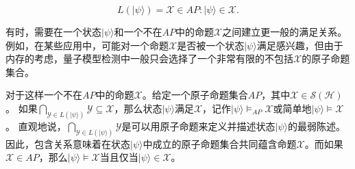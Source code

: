 \begin{equation}
L(|\psi\rangle) = {\mathcal{X} \in AP : |\psi\rangle \in \mathcal{X}}.
\end{equation}

有时，需要在一个状态$|\psi\rangle$和一个不在$AP$中的命题$\mathcal{X}$之间建立更一般的满足关系。例如，在某些应用中，可能对一个命题$\mathcal{X}$是否被一个状态$|\psi\rangle$满足感兴趣，但由于内存的考虑，量子模型检测中一般只会选择了一个非常有限的不包括$\mathcal{X}$的原子命题集合。

对于这样一个不在$AP$中的命题$\mathcal{X}$。给定一个原子命题集合$AP$，其中$\mathcal{X} \in \mathcal{S}(\mathcal{H})$。
如果$\bigcap_{\mathcal{Y} \in L(|\psi\rangle) }\mathcal{Y} \subseteq \mathcal{X}$，那么状态$|\psi\rangle$满足$\mathcal{X}$，记作$|\psi\rangle \models_{AP} \mathcal{X}$或简单地$|\psi\rangle \models \mathcal{X}$。
直观地说，$\bigcap_{\mathcal{Y} \in L(|\psi\rangle)} \mathcal{Y}$是可以用原子命题来定义并描述状态$|\psi\rangle$的最弱陈述。因此，包含关系意味着在状态$|\psi\rangle$中成立的原子命题集合共同蕴含命题$\mathcal{X}$。而如果$\mathcal{X} \in AP$，那么$|\psi\rangle \models \mathcal{X}$当且仅当$|\psi\rangle \in \mathcal{X}$。

